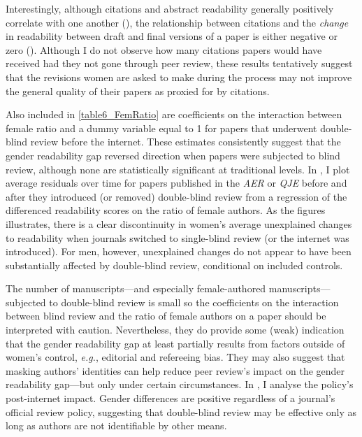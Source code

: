 Interestingly, although citations and abstract readability generally positively correlate with one another (), the relationship between citations and the \emph{change} in readability between draft and final versions of a paper is either negative or zero (). Although I do not observe how many citations papers would have received had they not gone through peer review, these results tentatively suggest that the revisions women are asked to make during the process may not improve the general quality of their papers as proxied for by citations.

Also included in \autoref{table6_FemRatio} are coefficients on the interaction between female ratio and a dummy variable equal to 1 for papers that underwent double-blind review before the internet. These estimates consistently suggest that the gender readability gap reversed direction when papers were subjected to blind review, although none are statistically significant at traditional levels. In , I plot average residuals over time for papers published in the \emph{AER} or \emph{QJE} before and after they introduced (or removed) double-blind review from a regression of the differenced readability scores on the ratio of female authors. As the figures illustrates, there is a clear discontinuity in women's average unexplained changes to readability when journals switched to single-blind review (or the internet was introduced). For men, however, unexplained changes do not appear to have been substantially affected by double-blind review, conditional on included controls.

The number of manuscripts---and especially female-authored manuscripts---subjected to double-blind review is small so the coefficients on the interaction between blind review and the ratio of female authors on a paper should be interpreted with caution. Nevertheless, they do provide some (weak) indication that the gender readability gap at least partially results from factors outside of women's control, \emph{e.g.}, editorial and refereeing bias. They may also suggest that masking authors' identities can help reduce peer review's impact on the gender readability gap---but only under certain circumstances. In , I analyse the policy's post-internet impact. Gender differences are positive regardless of a journal's official review policy, suggesting that double-blind review may be effective only as long as authors are not identifiable by other means.

